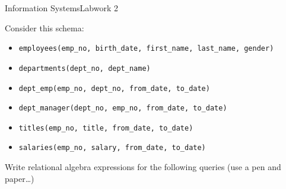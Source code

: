 \documentclass{assignment}
\begin{document}
%
{Information Systems}{Labwork 2}

Consider this schema:
\begin{itemize}[noitemsep]
    \item \texttt{employees(emp\_no, birth\_date, first\_name,
        last\_name, gender)}
    \item \texttt{departments(dept\_no, dept\_name)}
    \item \texttt{dept\_emp(emp\_no, dept\_no, from\_date, to\_date)}
    \item \texttt{dept\_manager(dept\_no, emp\_no, from\_date, to\_date)}
    \item \texttt{titles(emp\_no, title, from\_date, to\_date)}
    \item \texttt{salaries(emp\_no, salary, from\_date, to\_date)}
\end{itemize}

Write relational algebra expressions for the following queries (use a
pen and paper…)
\end{document}
